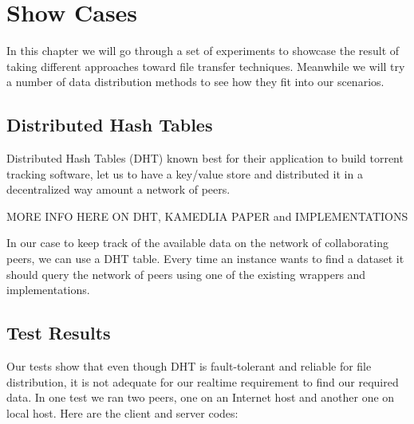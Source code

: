 \chapter{Show Cases}
\label{cha:exp}

In this chapter we will go through a set of experiments to showcase the result of taking different approaches toward file transfer techniques. Meanwhile we will try a number of data distribution methods to see how they fit into our scenarios.

\section{Distributed Hash Tables}
Distributed Hash Tables (DHT) known best for their application to build torrent tracking software, let us to have a key/value store and distributed it in a decentralized way amount a network of peers.

MORE INFO HERE ON DHT, KAMEDLIA PAPER and IMPLEMENTATIONS

In our case to keep track of the available data on the network of collaborating peers, we can use a DHT table. Every time an instance wants to find a dataset it should query the network of peers using one of the existing wrappers and implementations.

\section{Test Results}
Our tests show that even though DHT is fault-tolerant and reliable for file distribution, it is not adequate for our realtime requirement to find our required data. In one test we ran two peers, one on an Internet host and another one on local host. Here are the client and server codes:

